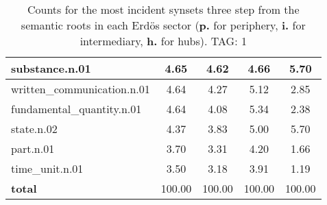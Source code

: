 \begin{table}[h!]
\begin{center}
\begin{tabular}{| l || c | c | c | c |}
substance.n.01 & 4.65  & 4.62  & 4.66  & 5.70 \\\hline
written\_communication.n.01 & 4.64  & 4.27  & 5.12  & 2.85 \\\hline
fundamental\_quantity.n.01 & 4.64  & 4.08  & 5.34  & 2.38 \\\hline
state.n.02 & 4.37  & 3.83  & 5.00  & 5.70 \\\hline
part.n.01 & 3.70  & 3.31  & 4.20  & 1.66 \\\hline
time\_unit.n.01 & 3.50  & 3.18  & 3.91  & 1.19 \\\hline\hline
{{\bf total}} & 100.00  & 100.00  & 100.00  & 100.00 \\\hline
\end{tabular}
\caption{Counts for the most incident synsets three step from the semantic roots in each Erd\"os sector ({\bf p.} for periphery, {\bf i.} for intermediary, {\bf h.} for hubs). TAG: 1}
\end{center}
\end{table}